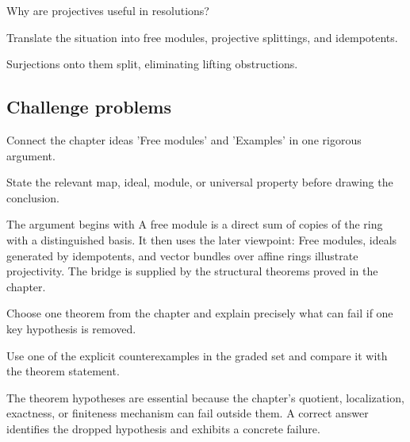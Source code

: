 \begin{exercise}[Resolutions]\label{exr:v13-expand-14}
Why are projectives useful in resolutions?
\end{exercise}
\begin{hint}
Translate the situation into free modules, projective splittings, and idempotents.
\end{hint}
\begin{solution}
Surjections onto them split, eliminating lifting obstructions.
\end{solution}

\subsection*{Challenge problems}

\begin{exercise}\label{exr:v13-expand-15}
Connect the chapter ideas 'Free modules' and 'Examples' in one rigorous argument.
\end{exercise}
\begin{hint}
State the relevant map, ideal, module, or universal property before drawing the conclusion.
\end{hint}
\begin{solution}
The argument begins with A free module is a direct sum of copies of the ring with a distinguished basis. It then uses the later viewpoint: Free modules, ideals generated by idempotents, and vector bundles over affine rings illustrate projectivity. The bridge is supplied by the structural theorems proved in the chapter.
\end{solution}

\begin{exercise}\label{exr:v13-expand-16}
Choose one theorem from the chapter and explain precisely what can fail if one key hypothesis is removed.
\end{exercise}
\begin{hint}
Use one of the explicit counterexamples in the graded set and compare it with the theorem statement.
\end{hint}
\begin{solution}
The theorem hypotheses are essential because the chapter's quotient, localization, exactness, or finiteness mechanism can fail outside them. A correct answer identifies the dropped hypothesis and exhibits a concrete failure.
\end{solution}

